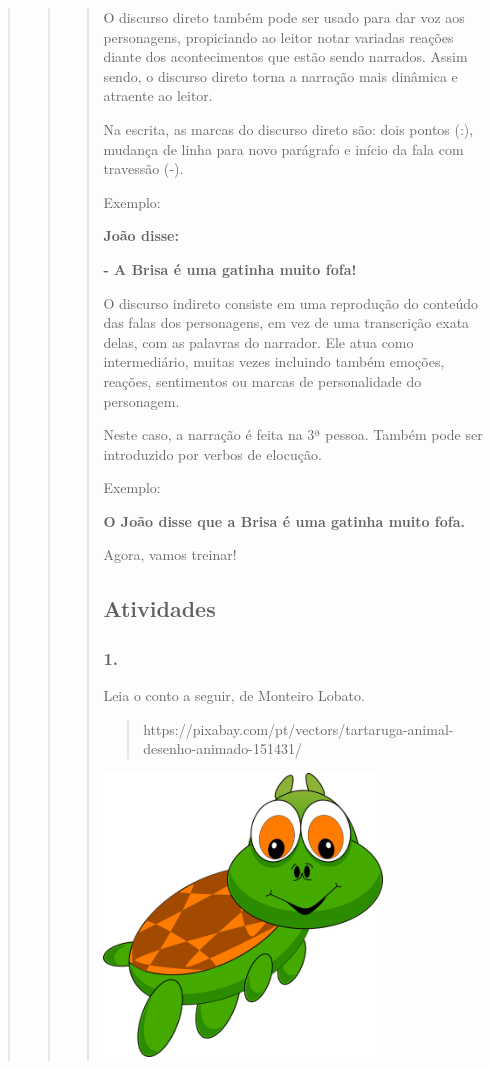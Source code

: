\begin{quote}
\begin{quote}
\begin{quote}
O discurso direto também pode ser usado para dar voz aos personagens,
propiciando ao leitor notar variadas reações diante dos acontecimentos
que estão sendo narrados. Assim sendo, o discurso direto torna a
narração mais dinâmica e atraente ao leitor.

Na escrita, as marcas do discurso direto são: dois pontos (:), mudança
de linha para novo parágrafo e início da fala com travessão (-).

Exemplo:

\textbf{João disse:}

\textbf{- A Brisa é uma gatinha muito fofa!}

O discurso indireto consiste em uma reprodução do conteúdo das falas dos
personagens, em vez de uma transcrição exata delas, com as palavras do
narrador. Ele atua como intermediário, muitas vezes incluindo também
emoções, reações, sentimentos ou marcas de personalidade do personagem.

Neste caso, a narração é feita na 3ª pessoa. Também pode ser introduzido
por verbos de elocução.

Exemplo:

\textbf{O João disse que a Brisa é uma gatinha muito fofa.}

Agora, vamos treinar!

\subsection{Atividades}\label{atividades-5}

\subsubsection{1. }\label{section-55}

Leia o conto a seguir, de Monteiro Lobato.

\begin{quote}
https://pixabay.com/pt/vectors/tartaruga-animal-desenho-animado-151431/
\end{quote}

\includegraphics[width=2.90902in,height=2.95828in]{media/image19.png}


\end{quote}
\end{quote}
\end{quote}
